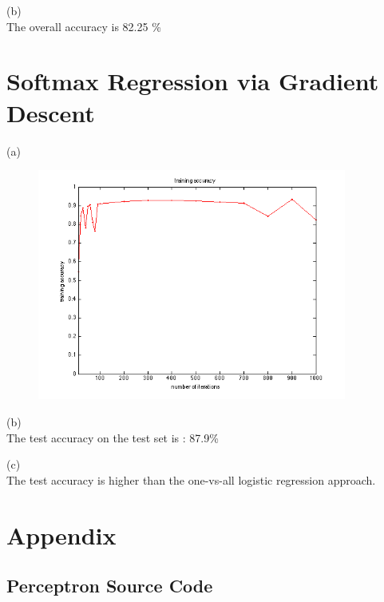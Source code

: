 \documentclass{article} %
\begin{document}
(b) \\
The overall accuracy is 82.25 \%


\section{Softmax Regression via Gradient Descent}

(a) \\
\begin{figure}[htbp] %
   \centering
   \includegraphics[width=4in]{img/data.png} 
\end{figure}

(b) \\

The test accuracy on the test set is : 87.9\%

(c) \\
The test accuracy is higher than the one-vs-all logistic regression approach.

\section{Appendix}
\label{headings}

\subsection{Perceptron Source Code}
\end{document}
